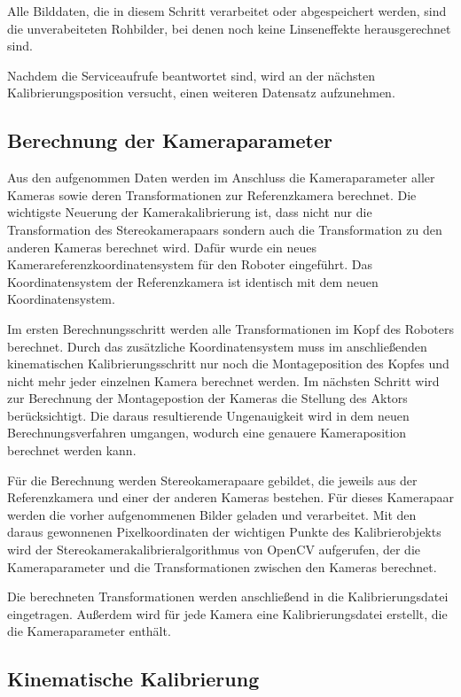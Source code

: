 Alle Bilddaten, die in diesem Schritt verarbeitet oder abgespeichert werden, sind
die unverabeiteten Rohbilder, bei denen noch keine Linseneffekte herausgerechnet
sind.

Nachdem die Serviceaufrufe beantwortet sind, wird an der nächsten
Kalibrierungsposition versucht, einen weiteren Datensatz aufzunehmen.

\subsection{Berechnung der Kameraparameter}
\label{sub:Berechnung der Kameraparameter}

Aus den aufgenommen Daten werden im Anschluss die Kameraparameter aller Kameras sowie
deren Transformationen zur Referenzkamera berechnet. Die wichtigste Neuerung der 
Kamerakalibrierung ist, dass nicht nur die Transformation des Stereokamerapaars
sondern auch die Transformation zu den anderen Kameras berechnet wird. Dafür 
wurde ein neues Kamerareferenzkoordinatensystem für den Roboter eingeführt. Das
Koordinatensystem der Referenzkamera ist identisch mit dem neuen Koordinatensystem.

Im ersten Berechnungsschritt werden alle Transformationen im Kopf des 
Roboters berechnet. Durch das zusätzliche Koordinatensystem muss 
im anschließenden kinematischen Kalibrierungsschritt nur noch die Montageposition
des Kopfes und nicht mehr jeder einzelnen Kamera berechnet werden. Im nächsten
Schritt wird zur Berechnung der Montagepostion der Kameras die Stellung des 
Aktors berücksichtigt. Die daraus resultierende Ungenauigkeit wird in dem neuen
Berechnungsverfahren umgangen, wodurch eine genauere Kameraposition berechnet
werden kann. 

Für die Berechnung werden Stereokamerapaare gebildet, die jeweils aus der
Referenzkamera und einer der anderen Kameras bestehen. Für dieses 
Kamerapaar werden die vorher aufgenommenen Bilder geladen und 
verarbeitet. Mit den daraus gewonnenen Pixelkoordinaten der wichtigen Punkte 
des Kalibrierobjekts wird der Stereokamerakalibrieralgorithmus von OpenCV 
aufgerufen, der die Kameraparameter und die Transformationen zwischen den Kameras 
berechnet. 

Die berechneten Transformationen werden anschließend in die Kalibrierungsdatei
eingetragen. Außerdem wird für jede Kamera eine Kalibrierungsdatei erstellt,
die die Kameraparameter enthält.


\subsection{Kinematische Kalibrierung}
\label{sub:Kinematische Kalibrierung_umsetzung}

